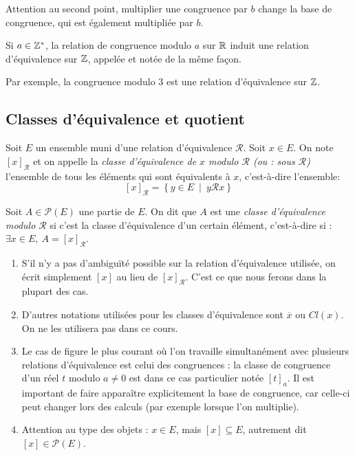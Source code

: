 \begin{remarque}
Attention au second point, multiplier une congruence par $b$ change la base de congruence, qui est également multipliée par $b$.
\end{remarque}

\begin{definition}
Si $a\in \mathbb{Z}^*$, la relation de congruence modulo $a$ sur $\mathbb{R}$ induit une relation d'équivalence sur $\mathbb{Z}$, appelée et notée de la même façon.
\end{definition}

Par exemple, la congruence modulo $3$ est une relation d'équivalence sur $\mathbb{Z}$.

\subsection{Classes d'équivalence et quotient}
\begin{definition}
Soit $E$ un ensemble muni d'une relation d'équivalence ${\mathcal R}$. Soit $x\in E$. On note $[x]_{\mathcal R}$  et on appelle la \emph{classe d'équivalence de $x$ modulo $\mathcal R$ (ou : sous $\mathcal R$)} l'ensemble  de tous les éléments qui sont équivalents à $x$, c'est-à-dire l'ensemble:
\[
[x]_{\mathcal R} = \left\{y\in E\:\mid\: y{\mathcal R}x\right\}
\]


Soit $A\in \mathcal P(E)$ une partie de $E$. On dit que $A$ est une \emph{classe d'équivalence modulo $\mathcal R$} si c'est la classe d'équivalence d'un certain élément, c'est-à-dire si : $\exists x\in E, \: A=[x]_{\mathcal R}$.
\end{definition}
\begin{remarque}
\begin{enumerate}
\item S'il n'y a pas d'ambiguïté possible sur la relation d'équivalence utilisée, on écrit simplement $[x]$ au lieu de $[x]_{\mathcal R}$. C'est ce que nous ferons dans la plupart des cas. 
\item D'autres notations utilisées pour les classes d'équivalence sont $\overline{x}$ ou $Cl(x)$. On ne les utilisera pas dans ce cours.
\item Le cas de figure le plus courant où l'on travaille simultanément avec plusieurs relations d'équivalence est celui des congruences : la classe de congruence d'un réel $t$ modulo $a\neq 0$ est dans ce cas particulier notée $[t]_a$. Il est important de faire apparaître explicitement la base de congruence, car celle-ci peut changer lors des calculs (par exemple lorsque l'on multiplie).
\item Attention au type des objets : $x \in E$, mais $[x] \subseteq E$, autrement dit $[x] \in \mathcal P(E)$.
\end{enumerate}
\end{remarque}
